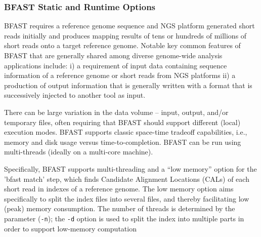 \documentclass{cpeauth}
\begin{document}

\subsubsection{BFAST Static and Runtime Options}

BFAST requires a reference genome sequence and NGS platform generated
short reads initially and produces mapping results of tens or hundreds of millions of
short reads onto a target reference genome.  Notable key common
features of BFAST that are generally shared among diverse genome-wide
analysis applications include: i) a requirement of input data
containing sequence information of a reference genome or short reads
from NGS platforms ii) a production of output information that is
generally written with a format that is successively injected to
another tool as input.

 
 
There can be large variation in the data volume -- input, output,
and/or temporary files, often requiring that BFAST should support
different (local) execution modes.  BFAST supports classic space-time
tradeoff capabilities, i.e., memory and disk usage versus
time-to-completion. BFAST can be run using multi-threads (ideally
on a multi-core machine).

Specifically, BFAST supports multi-threading and a ``low memory''
option for the 'bfast match' step, which finds Candidate Alignment
Locations (CALs) of each short read in indexes of a reference genome.
The low memory option aims specifically to split the index files into
several files, and thereby facilitating low (peak) memory consumption.
The number of threads is determined by the parameter (\texttt{-n});
the \texttt{-d} option is used to split the index into multiple parts
in order to support low-memory computation
\end{document}
